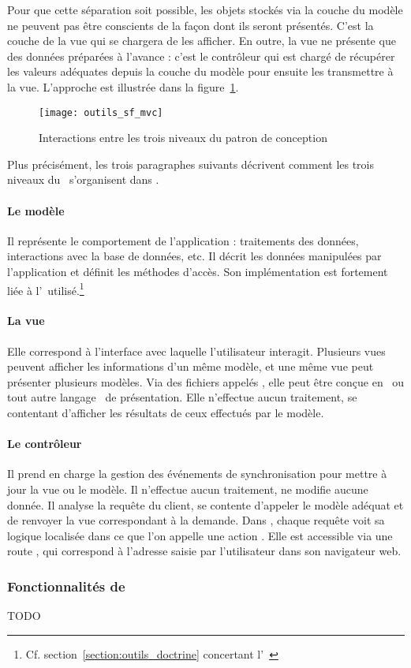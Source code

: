 Pour que cette séparation soit possible, les objets stockés via la couche du modèle ne peuvent pas être conscients de la façon dont ils seront présentés. C'est la couche de la vue qui se chargera de les afficher. En outre, la vue ne présente que des données préparées à l'avance : c'est le contrôleur qui est chargé de récupérer les valeurs adéquates depuis la couche du modèle pour ensuite les transmettre à la vue. L'approche est illustrée dans la figure~\ref{figure:outils_sf_mvc}.

\begin{figure}
	\centering
	\texttt{[image: outils\_sf\_mvc]}
	\caption{Interactions entre les trois niveaux du patron de conception \amvc}
	\label{figure:outils_sf_mvc}
\end{figure}

Plus précisément, les trois paragraphes suivants décrivent comment les trois niveaux du \amvc\ s'organisent dans \asf.

\paragraph{Le modèle}

Il représente le comportement de l'application : traitements des données, interactions avec la base de données, etc. Il décrit les données manipulées par l'application et définit les méthodes d'accès. Son implémentation est fortement liée à l'\aorm\ utilisé.\footnote{Cf. section~\ref{section:outils_doctrine} concertant l'\aorm\ \adoctrine}

\paragraph{La vue}

Elle correspond à l'interface avec laquelle l'utilisateur interagit. Plusieurs vues peuvent afficher les informations d'un même modèle, et une même vue peut présenter plusieurs modèles. Via des fichiers appelés \atemplates, elle peut être conçue en \ahtml\ ou tout autre \og langage \fg\ de pré\-sen\-ta\-ti\-on. Elle n'effectue aucun traitement, se contentant d'afficher les résultats de ceux effectués par le modèle.

\paragraph{Le contrôleur}

Il prend en charge la gestion des événements de synchronisation pour mettre à jour la vue ou le modèle. Il n'effectue aucun traitement, ne modifie aucune donnée. Il analyse la requête du client, se contente d'appeler le modèle adéquat et de renvoyer la vue correspondant à la demande. Dans \asf, chaque requête voit sa logique localisée dans ce que l'on appelle une \og action \fg. Elle est accessible via une \og route \fg, qui correspond à l'adresse saisie par l'utilisateur dans son navigateur web.


\subsubsection{Fonctionnalités de \asf}

TODO

